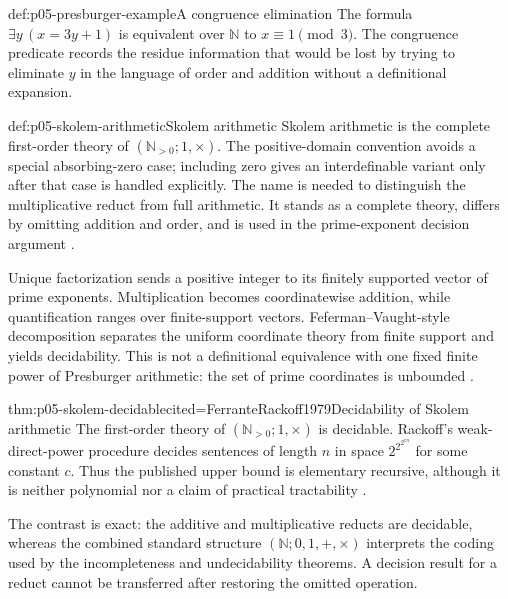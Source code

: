 \begin{hbexample}{def:p05-presburger-example}{A congruence elimination}
The formula \(\exists y\,(x=3y+1)\) is equivalent over \(\mathbb N\) to
\(x\equiv1\pmod3\). The congruence predicate records the residue information
that would be lost by trying to eliminate \(y\) in the language of order and
addition without a definitional expansion.
\end{hbexample}

\begin{hbdefinition}{def:p05-skolem-arithmetic}{Skolem arithmetic}
Skolem arithmetic is the complete first-order theory of
\((\mathbb N_{>0};1,\times)\). The positive-domain convention avoids a special
absorbing-zero case; including zero gives an interdefinable variant only after
that case is handled explicitly. The name is needed to distinguish the
multiplicative reduct from full arithmetic. It stands as a complete theory,
differs by omitting addition and order, and is used in the prime-exponent
decision argument \cite{Skolem1930Arithmetic}.
\end{hbdefinition}

Unique factorization sends a positive integer to its finitely supported vector
of prime exponents. Multiplication becomes coordinatewise addition, while
quantification ranges over finite-support vectors. Feferman--Vaught-style
decomposition separates the uniform coordinate theory from finite support and
yields decidability. This is not a definitional equivalence with one fixed
finite power of Presburger arithmetic: the set of prime coordinates is
unbounded \cite{FefermanVaught1959}.

\begin{hbtheorem}{thm:p05-skolem-decidable}{cited=FerranteRackoff1979}{Decidability of Skolem arithmetic}
The first-order theory of \((\mathbb N_{>0};1,\times)\) is decidable.  Rackoff's
weak-direct-power procedure decides sentences of length \(n\) in space
\(2^{2^{2^{cn}}}\) for some constant \(c\).  Thus the published upper bound is
elementary recursive, although it is neither polynomial nor a claim of
practical tractability \cite{Rackoff1976}.
\end{hbtheorem}

The contrast is exact: the additive and multiplicative reducts are decidable,
whereas the combined standard structure \((\mathbb N;0,1,+,\times)\) interprets
the coding used by the incompleteness and undecidability theorems. A decision
result for a reduct cannot be transferred after restoring the omitted
operation.

